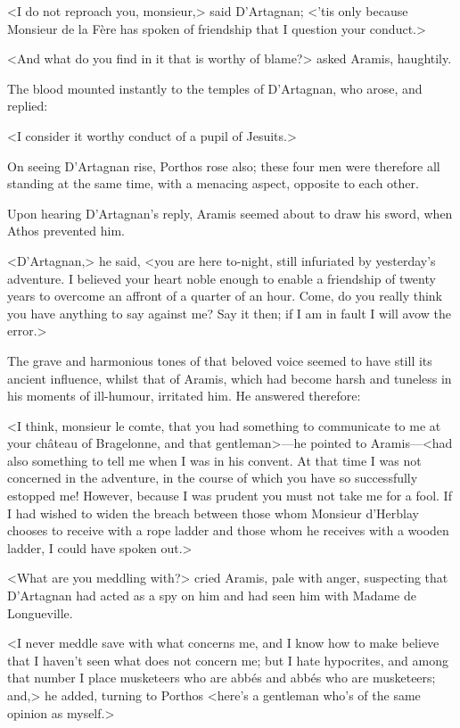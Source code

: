 <I do not reproach you, monsieur,> said D'Artagnan; <'tis only because Monsieur de la Fère has spoken of friendship that I question your conduct.>

<And what do you find in it that is worthy of blame?> asked Aramis, haughtily.

The blood mounted instantly to the temples of D'Artagnan, who arose, and replied:

<I consider it worthy conduct of a pupil of Jesuits.>

On seeing D'Artagnan rise, Porthos rose also; these four men were therefore all standing at the same time, with a menacing aspect, opposite to each other.

Upon hearing D'Artagnan's reply, Aramis seemed about to draw his sword, when Athos prevented him.

<D'Artagnan,> he said, <you are here to-night, still infuriated by yesterday's adventure. I believed your heart noble enough to enable a friendship of twenty years to overcome an affront of a quarter of an hour. Come, do you really think you have anything to say against me? Say it then; if I am in fault I will avow the error.>

The grave and harmonious tones of that beloved voice seemed to have still its ancient influence, whilst that of Aramis, which had become harsh and tuneless in his moments of ill-humour, irritated him. He answered therefore:

<I think, monsieur le comte, that you had something to communicate to me at your château of Bragelonne, and that gentleman>—he pointed to Aramis—<had also something to tell me when I was in his convent. At that time I was not concerned in the adventure, in the course of which you have so successfully estopped me! However, because I was prudent you must not take me for a fool. If I had wished to widen the breach between those whom Monsieur d'Herblay chooses to receive with a rope ladder and those whom he receives with a wooden ladder, I could have spoken out.>

<What are you meddling with?> cried Aramis, pale with anger, suspecting that D'Artagnan had acted as a spy on him and had seen him with Madame de Longueville.

<I never meddle save with what concerns me, and I know how to make believe that I haven't seen what does not concern me; but I hate hypocrites, and among that number I place musketeers who are abbés and abbés who are musketeers; and,> he added, turning to Porthos <here's a gentleman who's of the same opinion as myself.>

